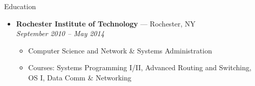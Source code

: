 \documentclass[10pt,oneside]{article}
\newenvironment{ressection}[1]{
	\vspace{3pt}
	{\fontfamily{bch}\selectfont\Large#1}
	\begin{itemize}
	\vspace{2pt}
}{
	\end{itemize}
}
\newcommand{\resitem}[1]{
	\vspace{-2pt}
	\item \begin{flushleft} #1 \end{flushleft}
}
\newcommand{\ressubitem}[1]{
	\vspace{-1pt}
	\item \begin{flushleft} #1 \end{flushleft}
}
\newcommand{\resbigitem}[3]{
	\vspace{-3pt}
	\item
	\textbf{#1} --- #2 \\
	\textit{#3}
}
\newenvironment{ressubsec}[3]{
	\resbigitem{#1}{#2}{#3}
	\vspace{-1pt}
	\begin{itemize}
}{
	\end{itemize}
}
\begin{document}
\begin{ressection}{Education}

	\begin{ressubsec}{Rochester Institute of Technology}{Rochester, NY}{September 2010 -- May 2014}
		\ressubitem{Computer Science and Network \& Systems Administration}
		\ressubitem{Courses: Systems Programming I/II, Advanced Routing and Switching, OS I, Data Comm \& Networking}
	\end{ressubsec}

\end{ressection}


% 
% 
\end{document}
